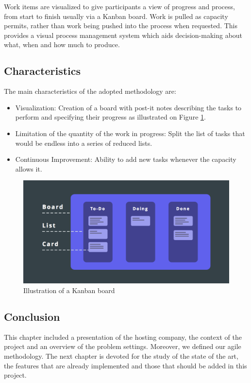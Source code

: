 Work items are visualized to give participants a view of progress and process, from start
to finish usually via a Kanban board. Work is pulled as capacity permits, rather than work
being pushed into the process when requested. This provides a visual process management
system which aids decision-making about what, when and how much to produce.
\subsection{Characteristics}

The main characteristics of the adopted methodology are:
    \begin{itemize}
        \item Visualization: Creation of a board with post-it notes describing the tasks to perform
        and specifying their progress as illustrated on Figure \ref{kanban}.
        \item Limitation of the quantity of the work in progress: Split the list of tasks that would be endless into a series of reduced lists.
        \item Continuous Improvement: Ability to add new tasks whenever the capacity allows it.
    \end{itemize}
\begin{figure}[!htpb]
\begin{center}
\includegraphics[height=3.0 in]{images/ATHENAkanban.png}
\caption{Illustration of a Kanban board}
\label{kanban}
\end{center}
\end{figure} 
\subsection *{Conclusion}

This chapter included a presentation of the hosting company, the context of the project and an overview of the problem settings. Moreover, we defined our agile methodology. The next chapter is devoted for the study
of the state of the art, the features that are already implemented and those that should be added in this project.